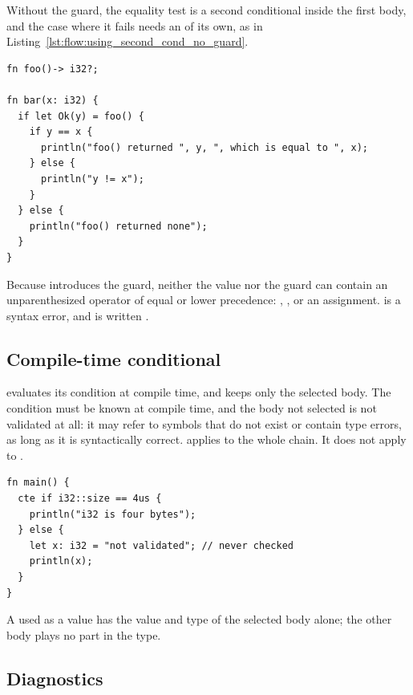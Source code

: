 Without the guard, the equality test is a second conditional inside the first
body, and the case where it fails needs an  of its own, as in
Listing~\ref{lst:flow:using_second_cond_no_guard}.

\begin{lstlisting}[style=coloredverbatim, caption=Using a second condition instead of pattern guard, label=lst:flow:using_second_cond_no_guard]
fn foo()-> i32?;

fn bar(x: i32) {
  if let Ok(y) = foo() {
    if y == x {
      println("foo() returned ", y, ", which is equal to ", x);
    } else {
      println("y != x");
    }
  } else {
    println("foo() returned none");
  }
}
\end{lstlisting}

Because \token{\&\&} introduces the guard, neither the value nor the guard can
contain an unparenthesized operator of equal or lower precedence: \token{\&\&},
\token{||}, or an assignment.  is a
syntax error, and is written .

\subsection{Compile-time conditional}
\label{sec:flow:cte_if}

 evaluates its condition at compile time, and keeps only the
selected body. The condition must be known at compile time, and the body not
selected is not validated at all: it may refer to symbols that do not exist or
contain type errors, as long as it is syntactically correct.  applies
to the whole  chain. It does not apply to .

\begin{lstlisting}[style=coloredverbatim, caption=A compile-time conditional]
fn main() {
  cte if i32::size == 4us {
    println("i32 is four bytes");
  } else {
    let x: i32 = "not validated"; // never checked
    println(x);
  }
}
\end{lstlisting}

A  used as a value has the value and type of the selected body
alone; the other body plays no part in the type.

\subsection{Diagnostics}

